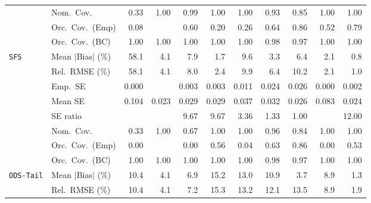 \begin{landscape}
\begin{longtable}{llrrrrrrrrr}
 & Nom.\ Cov. & 0.33 & \cellcolor{rankthree}1.00 & \cellcolor{ranktwo}0.99 & \cellcolor{rankthree}1.00 & \cellcolor{rankthree}1.00 & \cellcolor{rankone}0.93 & 0.85 & \cellcolor{rankthree}1.00 & \cellcolor{rankthree}1.00 \\
 & Orc.\ Cov.\ (Emp) & 0.08 &  & 0.60 & 0.20 & 0.26 & \cellcolor{rankthree}0.64 & \cellcolor{rankone}0.86 & 0.52 & \cellcolor{ranktwo}0.79 \\
 & Orc.\ Cov.\ (BC) & \cellcolor{rankthree}1.00 & \cellcolor{rankthree}1.00 & \cellcolor{rankthree}1.00 & \cellcolor{rankthree}1.00 & \cellcolor{rankthree}1.00 & \cellcolor{ranktwo}0.98 & \cellcolor{rankone}0.97 & \cellcolor{rankthree}1.00 & \cellcolor{rankthree}1.00 \\
\addlinespace[2pt]
\quad \texttt{SFS} & Mean $|$Bias$|$ (\%) & 58.1 & 4.1 & 7.9 & \cellcolor{ranktwo}1.7 & 9.6 & 3.3 & 6.4 & \cellcolor{rankthree}2.1 & \cellcolor{rankone}0.8 \\
 & Rel.\ RMSE (\%) & 58.1 & 4.1 & 8.0 & \cellcolor{rankthree}2.4 & 9.9 & 6.4 & 10.2 & \cellcolor{ranktwo}2.1 & \cellcolor{rankone}1.0 \\
 & Emp.\ SE & 0.000 &  & 0.003 & 0.003 & 0.011 & 0.024 & 0.026 & 0.000 & 0.002 \\
 & Mean SE & 0.104 & 0.023 & 0.029 & 0.029 & 0.037 & 0.032 & 0.026 & 0.083 & 0.024 \\
 & SE ratio &  &  & 9.67 & 9.67 & \cellcolor{rankthree}3.36 & \cellcolor{ranktwo}1.33 & \cellcolor{rankone}1.00 &  & 12.00 \\
 & Nom.\ Cov. & 0.33 & \cellcolor{ranktwo}1.00 & 0.67 & \cellcolor{ranktwo}1.00 & \cellcolor{ranktwo}1.00 & \cellcolor{rankone}0.96 & \cellcolor{rankthree}0.84 & \cellcolor{ranktwo}1.00 & \cellcolor{ranktwo}1.00 \\
 & Orc.\ Cov.\ (Emp) & 0.00 &  & 0.00 & \cellcolor{rankthree}0.56 & 0.04 & \cellcolor{ranktwo}0.63 & \cellcolor{rankone}0.86 & 0.00 & 0.53 \\
 & Orc.\ Cov.\ (BC) & \cellcolor{rankthree}1.00 & \cellcolor{rankthree}1.00 & \cellcolor{rankthree}1.00 & \cellcolor{rankthree}1.00 & \cellcolor{rankthree}1.00 & \cellcolor{ranktwo}0.98 & \cellcolor{rankone}0.97 & \cellcolor{rankthree}1.00 & \cellcolor{rankthree}1.00 \\
\addlinespace[2pt]
\quad \texttt{ODS-Tail} & Mean $|$Bias$|$ (\%) & 10.4 & \cellcolor{rankthree}4.1 & 6.9 & 15.2 & 13.0 & 10.9 & \cellcolor{ranktwo}3.7 & 8.9 & \cellcolor{rankone}1.3 \\
 & Rel.\ RMSE (\%) & 10.4 & \cellcolor{ranktwo}4.1 & \cellcolor{rankthree}7.2 & 15.3 & 13.2 & 12.1 & 13.5 & 8.9 & \cellcolor{rankone}1.9 \\

\end{longtable}
\end{landscape}
